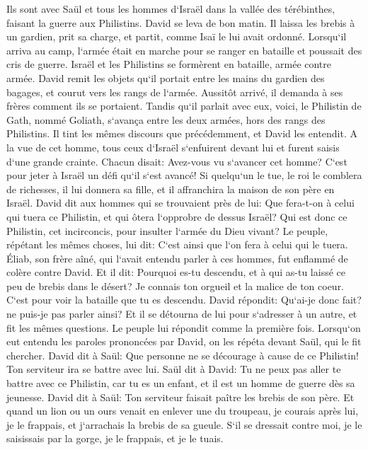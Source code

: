 \verse Ils sont avec Saül et tous les hommes d`Israël dans la vallée des térébinthes, faisant la guerre aux Philistins. 
\verse David se leva de bon matin. Il laissa les brebis à un gardien, prit sa charge, et partit, comme Isaï le lui avait ordonné. Lorsqu`il arriva au camp, l`armée était en marche pour se ranger en bataille et poussait des cris de guerre. 
\verse Israël et les Philistins se formèrent en bataille, armée contre armée. 
\verse David remit les objets qu`il portait entre les mains du gardien des bagages, et courut vers les rangs de l`armée. Aussitôt arrivé, il demanda à ses frères comment ils se portaient. 
\verse Tandis qu`il parlait avec eux, voici, le Philistin de Gath, nommé Goliath, s`avança entre les deux armées, hors des rangs des Philistins. Il tint les mêmes discours que précédemment, et David les entendit. 
\verse A la vue de cet homme, tous ceux d`Israël s`enfuirent devant lui et furent saisis d`une grande crainte. 
\verse Chacun disait: Avez-vous vu s`avancer cet homme? C`est pour jeter à Israël un défi qu`il s`est avancé! Si quelqu`un le tue, le roi le comblera de richesses, il lui donnera sa fille, et il affranchira la maison de son père en Israël. 
\verse David dit aux hommes qui se trouvaient près de lui: Que fera-t-on à celui qui tuera ce Philistin, et qui ôtera l`opprobre de dessus Israël? Qui est donc ce Philistin, cet incirconcis, pour insulter l`armée du Dieu vivant? 
\verse Le peuple, répétant les mêmes choses, lui dit: C`est ainsi que l`on fera à celui qui le tuera. 
\verse Éliab, son frère aîné, qui l`avait entendu parler à ces hommes, fut enflammé de colère contre David. Et il dit: Pourquoi es-tu descendu, et à qui as-tu laissé ce peu de brebis dans le désert? Je connais ton orgueil et la malice de ton coeur. C`est pour voir la bataille que tu es descendu. 
\verse David répondit: Qu`ai-je donc fait? ne puis-je pas parler ainsi? 
\verse Et il se détourna de lui pour s`adresser à un autre, et fit les mêmes questions. Le peuple lui répondit comme la première fois. 
\verse Lorsqu`on eut entendu les paroles prononcées par David, on les répéta devant Saül, qui le fit chercher. 
\verse David dit à Saül: Que personne ne se décourage à cause de ce Philistin! Ton serviteur ira se battre avec lui. 
\verse Saül dit à David: Tu ne peux pas aller te battre avec ce Philistin, car tu es un enfant, et il est un homme de guerre dès sa jeunesse. 
\verse David dit à Saül: Ton serviteur faisait paître les brebis de son père. Et quand un lion ou un ours venait en enlever une du troupeau, 
\verse je courais après lui, je le frappais, et j`arrachais la brebis de sa gueule. S`il se dressait contre moi, je le saisissais par la gorge, je le frappais, et je le tuais. 
